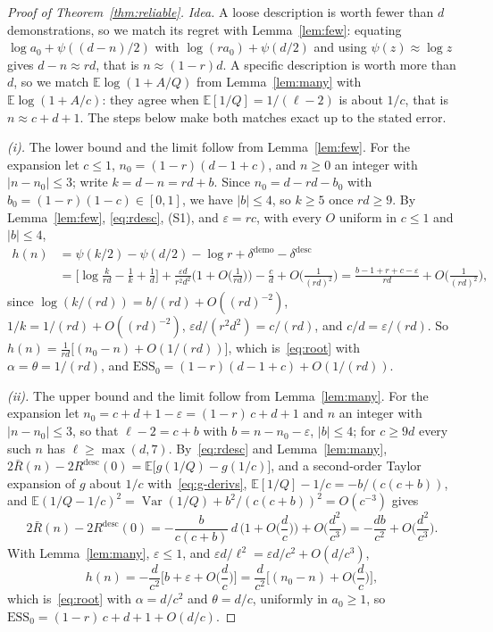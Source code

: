 \documentclass{article}
\newcommand{\ess}{\mathrm{ESS}}
\newcommand{\E}{\mathbb{E}}
\begin{document}
\begin{proof}[Proof of Theorem~\ref{thm:reliable}]
\emph{Idea.} A loose description is worth fewer than $d$ demonstrations, so we match its regret with Lemma~\ref{lem:few}: equating $\log a_0 + \psi((d-n)/2)$ with $\log(r a_0) + \psi(d/2)$ and using $\psi(z) \approx \log z$ gives $d - n \approx rd$, that is $n \approx (1-r)d$. A specific description is worth more than $d$, so we match $\E\log(1 + A/Q)$ from Lemma~\ref{lem:many} with $\E\log(1 + A/c)$: they agree when $\E[1/Q] = 1/(\ell - 2)$ is about $1/c$, that is $n \approx c + d + 1$. The steps below make both matches exact up to the stated error.

\emph{(i).} The lower bound and the limit follow from Lemma~\ref{lem:few}. For the expansion let $c \le 1$, $n_0 = (1-r)(d-1+c)$, and $n \ge 0$ an integer with $|n - n_0| \le 3$; write $k = d - n = rd + b$. Since $n_0 = d - rd - b_0$ with $b_0 = (1-r)(1-c) \in [0, 1]$, we have $|b| \le 4$, so $k \ge 5$ once $rd \ge 9$. By Lemma~\ref{lem:few}, \eqref{eq:rdesc}, (S1), and $\varepsilon = rc$, with every $O$ uniform in $c \le 1$ and $|b| \le 4$,
\begin{align*}
h(n) &= \psi(k/2) - \psi(d/2) - \log r + \delta^{\mathrm{demo}} - \delta^{\mathrm{desc}} \\
&= \Big[\log\frac{k}{rd} - \frac1k + \frac1d\Big] + \frac{\varepsilon d}{r^2 d^2}\Big(1 + O\Big(\frac{1}{rd}\Big)\Big) - \frac{c}{d} + O\Big(\frac{1}{(rd)^2}\Big)
 = \frac{b - 1 + r + c - \varepsilon}{rd} + O\Big(\frac{1}{(rd)^2}\Big),
\end{align*}
since $\log(k/(rd)) = b/(rd) + O((rd)^{-2})$, $1/k = 1/(rd) + O((rd)^{-2})$, $\varepsilon d / (r^2 d^2) = c/(rd)$, and $c/d = \varepsilon/(rd)$. So $h(n) = \frac{1}{rd}\big[(n_0 - n) + O(1/(rd))\big]$, which is~\eqref{eq:root} with $\alpha = \theta = 1/(rd)$, and $\ess_0 = (1-r)(d-1+c) + O(1/(rd))$.

\emph{(ii).} The upper bound and the limit follow from Lemma~\ref{lem:many}. For the expansion let $n_0 = c + d + 1 - \varepsilon = (1-r)\,c + d + 1$ and $n$ an integer with $|n - n_0| \le 3$, so that $\ell - 2 = c + b$ with $b = n - n_0 - \varepsilon$, $|b| \le 4$; for $c \ge 9d$ every such $n$ has $\ell \ge \max(d, 7)$. By~\eqref{eq:rdesc} and Lemma~\ref{lem:many}, $2\bar R(n) - 2R^{\mathrm{desc}}(0) = \E\big[g(1/Q) - g(1/c)\big]$, and a second-order Taylor expansion of $g$ about $1/c$ with~\eqref{eq:g-derivs}, $\E[1/Q] - 1/c = -b/(c(c+b))$, and $\E(1/Q - 1/c)^2 = \operatorname{Var}(1/Q) + b^2/(c(c+b))^2 = O(c^{-3})$ gives
\[
2\bar R(n) - 2R^{\mathrm{desc}}(0) = -\frac{b}{c(c+b)}\,d\,\Big(1 + O\Big(\frac dc\Big)\Big) + O\Big(\frac{d^2}{c^3}\Big) = -\frac{db}{c^2} + O\Big(\frac{d^2}{c^3}\Big).
\]
With Lemma~\ref{lem:many}, $\varepsilon \le 1$, and $\varepsilon d/\ell^2 = \varepsilon d/c^2 + O(d/c^3)$,
\[
h(n) = -\frac{d}{c^2}\Big[b + \varepsilon + O\Big(\frac{d}{c}\Big)\Big] = \frac{d}{c^2}\Big[(n_0 - n) + O\Big(\frac{d}{c}\Big)\Big],
\]
which is~\eqref{eq:root} with $\alpha = d/c^2$ and $\theta = d/c$, uniformly in $a_0 \ge 1$, so $\ess_0 = (1-r)\,c + d + 1 + O(d/c)$.


\end{proof}
\end{document}

